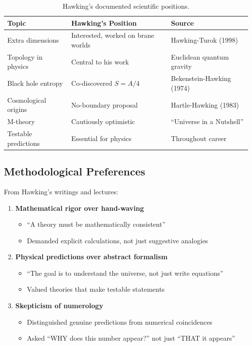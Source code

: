 \documentclass[12pt,a4paper]{article}
\begin{document}
\begin{table}[h]
\centering
\begin{tabular}{@{}lll@{}}
\toprule
Topic & Hawking's Position & Source \\
\midrule
Extra dimensions & Interested, worked on brane worlds & Hawking-Turok (1998) \\
Topology in physics & Central to his work & Euclidean quantum gravity \\
Black hole entropy & Co-discovered $S = A/4$ & Bekenstein-Hawking (1974) \\
Cosmological origins & No-boundary proposal & Hartle-Hawking (1983) \\
M-theory & Cautiously optimistic & ``Universe in a Nutshell'' \\
Testable predictions & Essential for physics & Throughout career \\
\bottomrule
\end{tabular}
\caption{Hawking's documented scientific positions.}
\end{table}

\subsection{Methodological Preferences}

From Hawking's writings and lectures:

\begin{enumerate}
\item \textbf{Mathematical rigor over hand-waving}
\begin{itemize}
\item ``A theory must be mathematically consistent''
\item Demanded explicit calculations, not just suggestive analogies
\end{itemize}

\item \textbf{Physical predictions over abstract formalism}
\begin{itemize}
\item ``The goal is to understand the universe, not just write equations''
\item Valued theories that make testable statements
\end{itemize}

\item \textbf{Skepticism of numerology}
\begin{itemize}
\item Distinguished genuine predictions from numerical coincidences
\item Asked ``WHY does this number appear?'' not just ``THAT it appears''
\end{itemize}
\end{enumerate}
\end{document}
